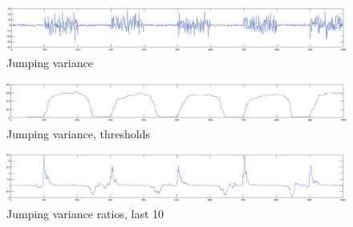 \begin{figure}
\centering
  \includegraphics[width=1\textwidth]{./Figures/notes/jumping_variance.eps}
  \caption[Jumping variance]{Jumping variance}
\end{figure}

\begin{figure}
\centering
  \includegraphics[width=1\textwidth]{./Figures/notes/jumping_variance_thresholds.eps}
  \caption[Jumping variance thresholds]{Jumping variance, thresholds}
\end{figure}

\begin{figure}
\centering
  \includegraphics[width=1\textwidth]{./Figures/notes/jumping_variance_ratios_10.eps}
  \caption[Jumping variance ratios]{Jumping variance ratios, last 10}
\end{figure}